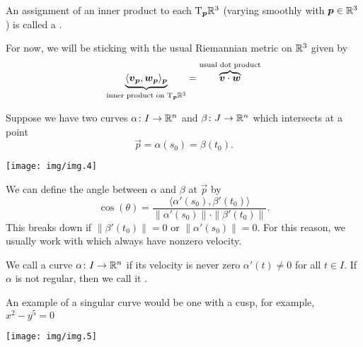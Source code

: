 \begin{definition}
An assignment of an inner product to each $\mathrm{T}_{\boldsymbol{p}}\mathbb{R}^{3}$ (varying
smoothly with $\boldsymbol{p}\in\mathbb{R}^{3}$) is called a .
\end{definition}

\begin{example}
For now, we will be sticking with the usual Riemannian metric on
$\mathbb{R}^{3}$ given by
\begin{equation}
\underbrace{\langle\boldsymbol{v}_{\boldsymbol{p}},\boldsymbol{w}_{\boldsymbol{p}}\rangle_{\boldsymbol{p}}}_{\text{inner product on }\mathrm{T}_{\boldsymbol{p}}\mathbb{R}^{3}}=
\overbrace{\boldsymbol{v}\cdot\boldsymbol{w}}^{\text{usual dot product}}
\end{equation}
\end{example}

\begin{example}
  Suppose we have two curves $\alpha\colon I\to \mathbb{R}^{n}$ and
  $\beta\colon J\to\mathbb{R}^{n}$ which intersects at a point
  \begin{equation}
\vec{p} = \alpha(s_{0}) = \beta(t_{0}).
  \end{equation}
\begin{center}
\texttt{[image: img/img.4]}
\end{center}
We can define the angle between $\alpha$ and $\beta$ at $\vec{p}$ by
\begin{equation}
  \cos(\theta) = \frac{\langle\alpha'(s_{0}),\beta'(t_{0})\rangle}{\|\alpha'(s_{0})\|\cdot\|\beta'(t_{0})\|}.
\end{equation}
This breaks down if $\|\beta'(t_{0})\|=0$ or $\|\alpha'(s_{0})\|=0$.
For this reason, we usually work with  which always have
nonzero velocity.
\end{example}

\begin{definition}
We call a curve $\alpha\colon I\to\mathbb{R}^{n}$  if its
velocity is never zero $\alpha'(t)\neq 0$ for all $t\in I$.
If $\alpha$ is not regular, then we call it .
\end{definition}

\begin{example}
  An example of a singular curve would be one with a cusp, for example,
  $x^{2}-y^{5}=0$

\begin{center}
  \texttt{[image: img/img.5]}
\end{center}
\end{example}

